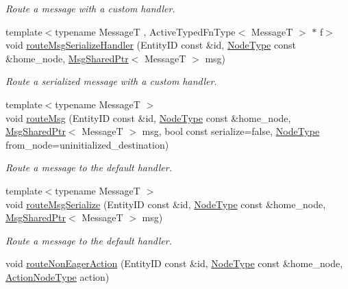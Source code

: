 \begin{DoxyCompactItemize}
\begin{DoxyCompactList}\small\item\em Route a message with a custom handler. \end{DoxyCompactList}\item 
{\footnotesize template$<$typename MessageT , Active\+Typed\+Fn\+Type$<$ Message\+T $>$ $\ast$ f$>$ }\\void \hyperlink{structvt_1_1location_1_1_entity_location_coord_ad0465263fbb33cf63819fd2c86f10cec}{route\+Msg\+Serialize\+Handler} (Entity\+ID const \&id, \hyperlink{namespacevt_a866da9d0efc19c0a1ce79e9e492f47e2}{Node\+Type} const \&home\+\_\+node, \hyperlink{namespacevt_ab2b3d506ec8e8d1540aede826d84a239}{Msg\+Shared\+Ptr}$<$ MessageT $>$ msg)
\begin{DoxyCompactList}\small\item\em Route a serialized message with a custom handler. \end{DoxyCompactList}\item 
{\footnotesize template$<$typename MessageT $>$ }\\void \hyperlink{structvt_1_1location_1_1_entity_location_coord_af447be2a20fef8a60afd73a6eb05bfc7}{route\+Msg} (Entity\+ID const \&id, \hyperlink{namespacevt_a866da9d0efc19c0a1ce79e9e492f47e2}{Node\+Type} const \&home\+\_\+node, \hyperlink{namespacevt_ab2b3d506ec8e8d1540aede826d84a239}{Msg\+Shared\+Ptr}$<$ MessageT $>$ msg, bool const serialize=false, \hyperlink{namespacevt_a866da9d0efc19c0a1ce79e9e492f47e2}{Node\+Type} from\+\_\+node=uninitialized\+\_\+destination)
\begin{DoxyCompactList}\small\item\em Route a message to the default handler. \end{DoxyCompactList}\item 
{\footnotesize template$<$typename MessageT $>$ }\\void \hyperlink{structvt_1_1location_1_1_entity_location_coord_a1a1d8dfa9ac9fdceadb5c2ef9b9cecb6}{route\+Msg\+Serialize} (Entity\+ID const \&id, \hyperlink{namespacevt_a866da9d0efc19c0a1ce79e9e492f47e2}{Node\+Type} const \&home\+\_\+node, \hyperlink{namespacevt_ab2b3d506ec8e8d1540aede826d84a239}{Msg\+Shared\+Ptr}$<$ MessageT $>$ msg)
\begin{DoxyCompactList}\small\item\em Route a message to the default handler. \end{DoxyCompactList}\item 
void \hyperlink{structvt_1_1location_1_1_entity_location_coord_ae7c1ec3412f2a16ea3f40d6bb39f23ca}{route\+Non\+Eager\+Action} (Entity\+ID const \&id, \hyperlink{namespacevt_a866da9d0efc19c0a1ce79e9e492f47e2}{Node\+Type} const \&home\+\_\+node, \hyperlink{namespacevt_a0436cb2d620dcbb21b5b49cd9c9c4749}{Action\+Node\+Type} action)

\end{DoxyCompactItemize}
